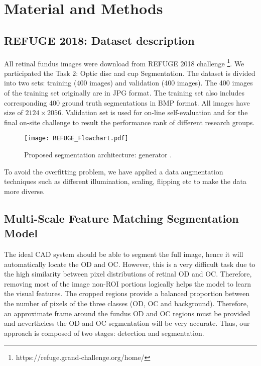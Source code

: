 \documentclass[runningheads,a4paper]{llncs}
\begin{document}
\section{Material and Methods}

\subsection{REFUGE 2018: Dataset description}
All retinal fundus images were download from REFUGE 2018 challenge \footnote{https://refuge.grand-challenge.org/home/}. We participated the Task 2: Optic disc and cup Segmentation. The dataset is divided into two sets: training (400 images) and validation (400 images). The 400 images of the training set  originally are in JPG format. The training set also includes corresponding 400 ground truth segmentations in BMP format. All images have size of $2124\times 2056$. Validation set is used for on-line self-evaluation and for the final on-site challenge to result the performance rank of different research groups.


\label{subsec:massSegcGAN}
\begin{figure*}[htp]
\centering
\texttt{[image: REFUGE\_Flowchart.pdf]}
\caption{Proposed segmentation architecture: generator .}
\label{fig:cGAN architecture}
\end{figure*}



To avoid the overfitting problem, we have applied a data augmentation techniques such as different illumination, scaling, flipping etc to make the data more diverse. 

\subsection{Multi-Scale Feature Matching Segmentation Model }


The ideal CAD system should be able to segment the full image, hence it will automatically locate the OD and OC. However, this is a very difficult task due to the high similarity between pixel distributions of retinal OD and OC. Therefore, removing most of the image non-ROI portions logically helps the model to learn the visual features. The cropped regions provide a balanced proportion between the number of pixels of the three classes (OD, OC and background). Therefore, an approximate frame around the fundus OD and OC regions must be provided and nevertheless the OD and OC segmentation will be very accurate. Thus, our approach is composed of two stages: detection and segmentation.
\end{document}
